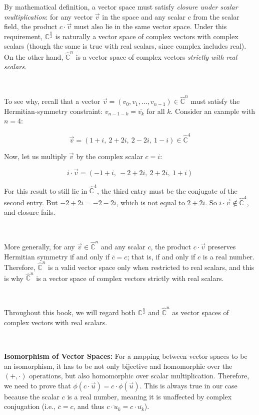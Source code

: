 \begin{tcolorbox}[title={\textbf{Vector Space of Complex Vectors with either Real or Complex Scalars}}]

By mathematical definition, a vector space must satisfy \textit{closure under scalar multiplication}: for any vector $\vec{v}$ in the space and any scalar $c$ from the scalar field, the product $c \cdot \vec{v}$ must also lie in the same vector space.  Under this requirement, $\mathbb{C}^{\frac{n}{2}}$ is naturally a vector space of complex vectors with complex scalars (though the same is true with real scalars, since complex includes real). On the other hand, $\hat{\mathbb{C}}^{n}$ is a vector space of complex vectors \textit{strictly with real scalars}.

$ $

To see why, recall that a vector $\vec{v} = (v_0, v_1, \dots, v_{n-1}) \in \hat{\mathbb{C}}^n$ must satisfy the Hermitian-symmetry constraint: $v_{n-1-k} = \overline{v_k}$ for all $k$. Consider an example with $n = 4$:

$$\vec{v} = (1+i,\ 2+2i,\ 2-2i,\ 1-i) \in \hat{\mathbb{C}}^4$$

Now, let us multiply $\vec{v}$ by the complex scalar $c = i$:

$$i \cdot \vec{v} = (-1+i,\ -2+2i,\ 2+2i,\ 1+i)$$

For this result to still lie in $\hat{\mathbb{C}}^4$, the third entry must be the conjugate of the second entry. But $\overline{-2+2i} = -2-2i$, which is not equal to $2+2i$. So $i \cdot \vec{v} \notin \hat{\mathbb{C}}^4$, and closure fails.

$ $

More generally, for any $\vec{v} \in \hat{\mathbb{C}}^n$ and any scalar $c$, the product $c \cdot \vec{v}$ preserves Hermitian symmetry if and only if $\overline{c} = c$; that is, if and only if $c$ is a real number. Therefore, $\hat{\mathbb{C}}^n$ is a valid vector space only when restricted to real scalars, and this is why $\hat{\mathbb{C}}^n$ is a vector space of complex vectors strictly with real scalars.

$ $

Throughout this book, we will regard both $\mathbb{C}^{\frac{n}{2}}$ and $\hat{\mathbb{C}}^{n}$ as vector spaces of complex vectors with real scalars.

$ $

\textbf{Isomorphism of Vector Spaces:} For a mapping between vector spaces to be an isomorphism, it has to be not only bijective and homomorphic over the $(+, \cdot)$ operations, but also homomorphic over scalar multiplication. Therefore, we need to prove that $\phi(c \cdot \vec{u}) = c \cdot \phi(\vec{u})$. This is always true in our case because the scalar $c$ is a real number, meaning it is unaffected by complex conjugation (i.e., $\overline{c} = c$, and thus $\overline{c \cdot u_k} = c \cdot \overline{u_k}$). 


\end{tcolorbox}

